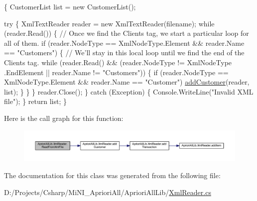 \begin{DoxyCode}
        \{
            CustomerList list = \textcolor{keyword}{new} CustomerList();

            \textcolor{keywordflow}{try}
            \{
                XmlTextReader reader = \textcolor{keyword}{new} XmlTextReader(filename);
                \textcolor{keywordflow}{while} (reader.Read())
                \{
                    \textcolor{comment}{// Once we find the Clients tag, we start a particular loop
       for all of them.}
                    \textcolor{keywordflow}{if} (reader.NodeType == XmlNodeType.Element && reader.Name 
      == \textcolor{stringliteral}{"Customers"})
                    \{
                        \textcolor{comment}{// We'll stay in this local loop until we find the end
       of the Clients tag.}
                        \textcolor{keywordflow}{while} (reader.Read() && (reader.NodeType != XmlNodeType
      .EndElement || reader.Name != \textcolor{stringliteral}{"Customers"}))
                        \{
                            \textcolor{keywordflow}{if} (reader.NodeType == XmlNodeType.Element && 
      reader.Name == \textcolor{stringliteral}{"Customer"})
                                \hyperlink{class_apriori_all_lib_1_1_xml_reader_a117782b010f24408af2a1308786b473a}{addCustomer}(reader, list);
                        \}
                    \}
                \}
                reader.Close();
            \}
            \textcolor{keywordflow}{catch} (Exception)
            \{
                Console.WriteLine(\textcolor{stringliteral}{"Invalid XML file"});
            \}
            \textcolor{keywordflow}{return} list;
        \}
\end{DoxyCode}


Here is the call graph for this function\-:
\nopagebreak
\begin{figure}[H]
\begin{center}
\leavevmode
\includegraphics[width=350pt]{class_apriori_all_lib_1_1_xml_reader_ab7285c4d5cee31f7a1001f00f4eeff25_cgraph}
\end{center}
\end{figure}




The documentation for this class was generated from the following file\-:\begin{DoxyCompactItemize}
\item 
D\-:/\-Projects/\-Csharp/\-Mi\-N\-I\-\_\-\-Apriori\-All/\-Apriori\-All\-Lib/\hyperlink{_xml_reader_8cs}{Xml\-Reader.\-cs}\end{DoxyCompactItemize}
